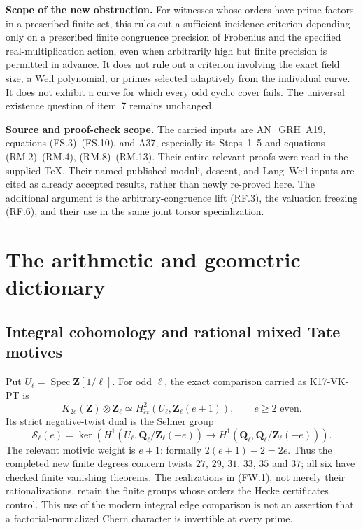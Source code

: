 \documentclass[11pt,a4paper]{article}
\theoremstyle{definition}
\renewcommand{\paragraph}[1]{\par\smallskip\noindent\textbf{#1}\quad\ignorespaces}
\begin{document}
\paragraph{Scope of the new obstruction.}
For witnesses whose orders have prime factors in a prescribed
finite set, this rules out a sufficient incidence criterion
depending only on a prescribed finite congruence precision of
Frobenius and the specified real-multiplication action, even
when arbitrarily high but finite precision is permitted in
advance.  It does
not rule out a criterion involving the exact field size, a
Weil polynomial, or primes selected adaptively from the
individual curve.  It does not exhibit a curve for which every
odd cyclic cover fails.  The universal existence question of
item~7 remains unchanged.

\paragraph{Source and proof-check scope.}
The carried inputs are AN\_GRH~A19, equations (FS.3)--(FS.10),
and A37, especially its Steps~1--5 and equations
(RM.2)--(RM.4), (RM.8)--(RM.13).  Their entire relevant
proofs were read in the supplied TeX.  Their named published
moduli, descent, and Lang--Weil inputs are cited as already
accepted results, rather than newly re-proved here.  The
additional argument is the arbitrary-congruence lift (RF.3),
the valuation freezing (RF.6), and their use in the same joint
torsor specialization.



\section{The arithmetic and geometric dictionary}
\label{sec:framework}

\subsection{Integral cohomology and rational mixed Tate motives}

Put $U_\ell=\operatorname{Spec}\mathbf Z[1/\ell]$.
For odd $\ell$, the exact comparison carried as K17-VK-PT is
\[
 K_{2e}(\mathbf Z)\otimes\mathbf Z_\ell
       \simeq H^2_{\acute et}(U_\ell,\mathbf Z_\ell(e+1)),
 \qquad e\ge2\text{ even}.
 \tag{FW.1}
\]
Its strict negative-twist dual is the Selmer group
\[
 \mathcal S_\ell(e)=\ker\left(
 H^1(U_\ell,\mathbf Q_\ell/\mathbf Z_\ell(-e))
 \longrightarrow
 H^1(\mathbf Q_\ell,\mathbf Q_\ell/\mathbf Z_\ell(-e))\right).
 \tag{FW.2}
\]
The relevant motivic weight is $e+1$: formally $2(e+1)-2=2e$.
Thus the completed new finite degrees concern twists $27$, $29$, $31$,
$33$, $35$ and $37$; all six have checked finite vanishing theorems.
The realizations in (FW.1), not merely their rationalizations,
retain the finite groups whose orders the Hecke certificates
control. This use of the modern integral edge comparison is
not an assertion that a factorial-normalized Chern character
is invertible at every prime.
\end{document}
